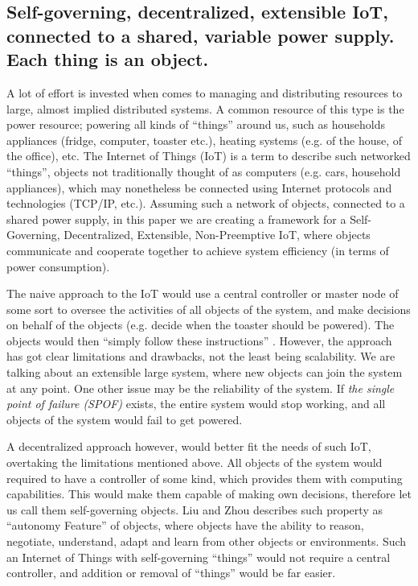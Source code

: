\documentclass[letterpaper, 10 pt, conference]{ieeeconf}
\begin{document}
\subsection{Self-governing, decentralized, extensible IoT, connected to a shared, variable power supply. Each thing is an object.}
A lot of effort is invested when comes to managing and distributing resources to large, almost implied distributed systems. A common resource of this type is the power resource; powering all kinds of ``things'' around us, such as households appliances (fridge, computer, toaster etc.), heating systems (e.g. of the house, of the office), etc. The Internet of Things (IoT) is a term to describe such networked ``things'', objects not traditionally thought of as computers (e.g. cars, household appliances), which may nonetheless be connected using Internet protocols and technologies (TCP/IP, etc.). Assuming such a network of objects, connected to a shared power supply, in this paper we are creating a framework for a Self-Governing, Decentralized, Extensible, Non-Preemptive IoT, where objects communicate and cooperate together to achieve system efficiency (in terms of power consumption).

The naive approach to the IoT would use a central controller or master node of some sort to oversee the activities of all objects of the system, and make decisions on behalf of the objects (e.g. decide when the toaster should be powered). The objects would then ``simply follow these instructions'' \cite{palattella2012standardized}. However, the approach has got clear limitations and drawbacks, not the least being scalability. We are talking about an extensible large system, where new objects can join the system at any point. One other issue may be the reliability of the system. If \emph{the single point of failure (SPOF)} exists, the entire system would stop working, and all objects of the system would fail to get powered.

A decentralized approach however, would better fit the needs of such IoT, overtaking the limitations mentioned above. All objects of the system would required to have a controller of some kind, which provides them with computing capabilities. This would make them capable of making own decisions, therefore let us call them self-governing objects. Liu and Zhou \cite{IoT6150221} describes such property as ``autonomy Feature'' of objects, where objects have the ability to reason, negotiate, understand, adapt and learn from other objects or environments. Such an Internet of Things with self-governing ``things'' would not require a central controller, and addition or removal of ``things'' would be far easier.
\end{document}
